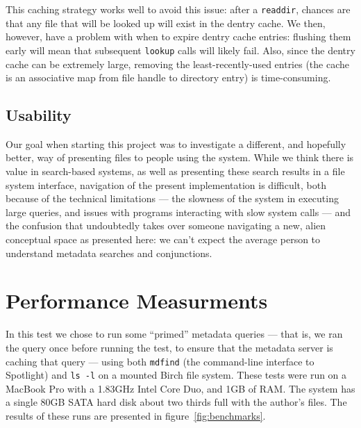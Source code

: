 \documentclass{article}
\begin{document}
This caching strategy works well to avoid this issue: after a
\texttt{readdir}, chances are that any file that will be looked up
will exist in the dentry cache. We then, however, have a problem with
when to expire dentry cache entries: flushing them early will mean
that subsequent \texttt{lookup} calls will likely fail. Also, since
the dentry cache can be extremely large, removing the
least-recently-used entries (the cache is an associative map from file
handle to directory entry) is time-consuming.

\subsection{Usability}

Our goal when starting this project was to investigate a different,
and hopefully better, way of presenting files to people using the
system. While we think there is value in search-based systems, as well
as presenting these search results in a file system interface,
navigation of the present implementation is difficult, both because of
the technical limitations --- the slowness of the system in executing
large queries, and issues with programs interacting with slow system
calls --- and the confusion that undoubtedly takes over someone
navigating a new, alien conceptual space as presented here: we can't
expect the average person to understand metadata searches and
conjunctions.

\section{Performance Measurments}

In this test we chose to run some ``primed'' metadata queries --- that
is, we ran the query once before running the test, to ensure that the
metadata server is caching that query --- using both \texttt{mdfind}
(the command-line interface to Spotlight) and \texttt{ls -l} on a
mounted Birch file system. These tests were run on a MacBook Pro with
a 1.83GHz Intel Core Duo, and 1GB of RAM. The system has a single 80GB
SATA hard disk about two thirds full with the author's files. The
results of these runs are presented in figure~\ref{fig:benchmarks}.
\end{document}
